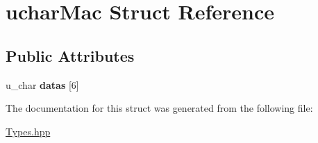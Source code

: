 \hypertarget{structuchar_mac}{\section{uchar\-Mac Struct Reference}
\label{structuchar_mac}
}
\subsection*{Public Attributes}
\begin{DoxyCompactItemize}
\item 
\hypertarget{structuchar_mac_ac775618c11156b0c2d0d8877c496870e}{u\-\_\-char {\bfseries datas} \mbox{[}6\mbox{]}}\label{structuchar_mac_ac775618c11156b0c2d0d8877c496870e}

\end{DoxyCompactItemize}


The documentation for this struct was generated from the following file\-:\begin{DoxyCompactItemize}
\item 
\hyperlink{_types_8hpp}{Types.\-hpp}\end{DoxyCompactItemize}
